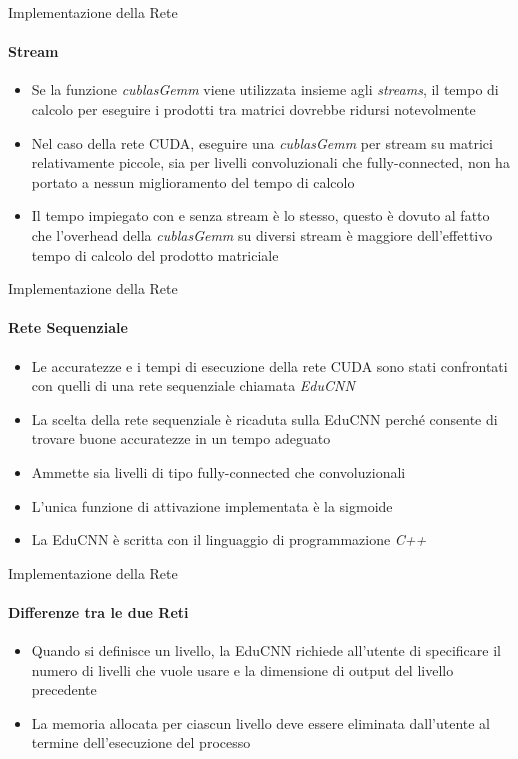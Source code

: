 \documentclass[
 ]{beamer}
\begin{document}
\begin{frame}{Implementazione della Rete}
    \framesubtitle{Stream}
      \begin{itemize} [<+->] 
        \setlength\itemsep{3em}           
            \item \large Se la funzione \emph{cublasGemm} viene utilizzata insieme agli \emph{streams}, il tempo di calcolo per eseguire i prodotti tra matrici dovrebbe ridursi notevolmente
            \item \large Nel caso della rete CUDA, eseguire una \emph{cublasGemm} per stream su matrici relativamente piccole, sia per livelli convoluzionali che fully-connected, non ha portato a nessun miglioramento del tempo di calcolo
            \item \large Il tempo impiegato con e senza stream è lo stesso, questo è dovuto al fatto che l'overhead della \emph{cublasGemm} su diversi stream è maggiore dell'effettivo tempo di calcolo del prodotto matriciale
        \end{itemize}
\end{frame}


\begin{frame}{Implementazione della Rete}
    \framesubtitle{Rete Sequenziale}
    \begin{itemize} [<+->]
        \setlength\itemsep{2em}
        \item \large Le accuratezze e i tempi di esecuzione della rete CUDA sono stati confrontati con quelli di una rete sequenziale chiamata \emph{EduCNN}
        \item \large La scelta della rete sequenziale è ricaduta sulla EduCNN perché consente di trovare buone accuratezze in un tempo adeguato
        \item \large Ammette sia livelli di tipo fully-connected che convoluzionali
        \item \large L'unica funzione di attivazione implementata è la sigmoide
        \item \large La EduCNN è scritta con il linguaggio di programmazione \emph{C++}
    \end{itemize}
\end{frame}


\begin{frame}{Implementazione della Rete}
    \framesubtitle{Differenze tra le due Reti}
    \smallskip
    \begin{itemize} [<+->]
        \setlength\itemsep{2em}
        \item \large Quando si definisce un livello, la EduCNN richiede all'utente di specificare il numero di livelli che vuole usare e la dimensione di output del livello precedente
        \item \large La memoria allocata per ciascun livello deve essere eliminata dall'utente al termine dell'esecuzione del processo 
    \end{itemize}     
\end{frame}
\end{document}
